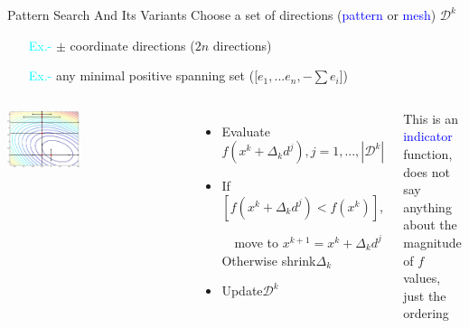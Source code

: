 \documentclass[handout,aspectratio=54]{beamer}
\numberwithin{theorem}{section}
\begin{document}
\begin{frame}{Pattern Search And Its Variants}\footnotesize
Choose a set of directions (\textcolor{blue}{pattern} or \textcolor{blue}{mesh}) $\mathcal{D}^k$

\begin{itemize}
\item[\textcolor{cyan}{Ex.-}] $\pm$ coordinate directions ($2n$ directions)
\item[\textcolor{cyan}{Ex.-}] any minimal positive spanning set ([$e_1,...e_n,-\sum e_i$])
\end{itemize}

\begin{columns}
\includegraphics[width=\textwidth]{fig/17-6.jpg}

\colorbox[rgb]{0.5,0.6,0.7}{\textcolor{white}{Basic iteration($k\ge0$):}}
\begin{itemize}\scriptsize
\item Evaluate $f(x^k+\Delta_kd^j),j=1,...,|\mathcal{D}^k|$
\item If $[f(x^k+\Delta_kd^j)<f(x^k)]$, 

$\quad$move to $x^{k+1}=x^k+\Delta_kd^j$\\

Otherwise shrink$\Delta_k$
\item Update$\mathcal{D}^k$
\end{itemize}
This is an \textcolor{blue}{indicator} function, does not say anything about the magnitude of $f$ values, just the ordering
\end{columns}

\vspace{1.2cm}

\tiny
{}

\end{frame}
\end{document}
